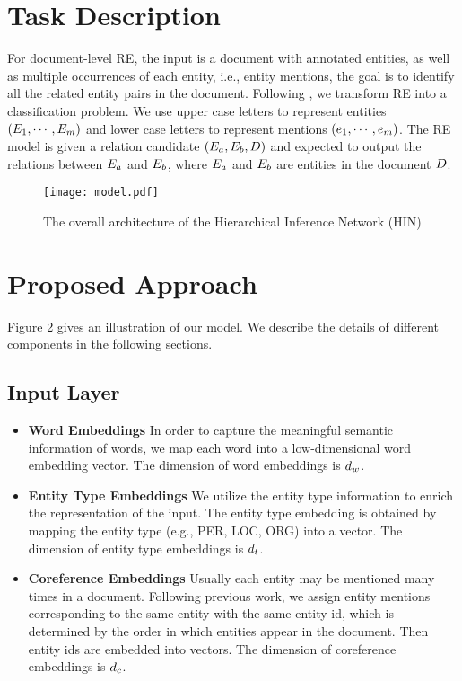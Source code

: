 \documentclass[runningheads]{llncs}
\begin{document}
\section{Task Description }
For document-level RE, the input is a document with annotated entities, as well as multiple occurrences of each entity, i.e., entity mentions,
the goal is to identify all the related entity pairs in the document.
Following \cite{Yao2019DocREDAL}, we transform RE into a classification problem.
We use upper case letters to represent entities $\small \left(E_{1}, \cdots, E_{m}\right)$ and lower case letters to represent mentions $\small \left(e_{1}, \cdots, e_{m}\right)$.
The RE model is given a relation candidate $\small \left(E_{a} , E_{b}, D\right)$ and expected to output the relations between $\small E_{a}$ and $\small E_{b}$, where $\small E_{a}$ and $\small E_{b}$ are entities in the document $\small D$.
\begin{figure*}[ht]
	\centering
	\texttt{[image: model.pdf]} 
	\protect\caption{The overall architecture of the Hierarchical Inference Network (HIN)}
	\label{Fig. 2}
\end{figure*}
\section{Proposed Approach}
Figure 2 gives an illustration of our model.
We describe the details of different components in the following sections. 

\subsection{Input Layer}
\begin{itemize}
	\item 
	\textbf{Word Embeddings}
	In order to capture the meaningful semantic information of words, we map each word into a low-dimensional word embedding vector. 
	The dimension of word embeddings is $\small d_{w}$.
	
	\item 
	\textbf{Entity Type Embeddings}
We utilize the entity type information to enrich the representation of the input.
	The entity type embedding is obtained by mapping the entity type (e.g., PER, LOC, ORG) into a vector. 
	The dimension of entity type embeddings is $\small d_{t}$.
	
	\item 
	\textbf{Coreference Embeddings}
	Usually each entity may be mentioned many times in a document.
	Following previous work, we assign entity mentions corresponding to the same entity with the same entity id, which is determined by the order in which entities appear in the document.
	Then entity ids are embedded into vectors. 
	The dimension of coreference embeddings is $\small d_{c}$.
\end{itemize}
\end{document}
